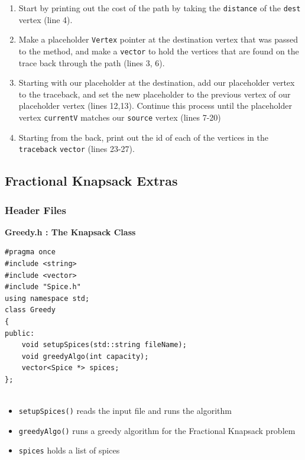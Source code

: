 \documentclass[letterpaper, 10pt]{article}
\begin{document}
\begin{enumerate}
    \item Start by printing out the cost of the path by taking the \texttt{distance} of the \texttt{dest} vertex (line 4).
    \item Make a placeholder \texttt{Vertex} pointer at the destination vertex that was passed to the method, and make a \texttt{vector} to hold the vertices that are found on the trace back through the path (lines 3, 6).
    \item Starting with our placeholder at the destination, add our placeholder vertex to the traceback, and set the new placeholder to the previous vertex of our placeholder vertex (lines 12,13). Continue this process until the placeholder vertex \texttt{currentV} matches our \texttt{source} vertex (lines 7-20)
    \item Starting from the back, print out the id of each of the vertices in the \texttt{traceback} \texttt{vector} (lines 23-27).
\end{enumerate}

\subsection{Fractional Knapsack Extras}
\subsubsection{Header Files}

\textbf{Greedy.h : The Knapsack Class}
 \begin{addmargin}[-5em]{1em}
\begin{small}
\begin{verbatim}
#pragma once
#include <string>
#include <vector>
#include "Spice.h"
using namespace std;
class Greedy
{
public:
    void setupSpices(std::string fileName);
    void greedyAlgo(int capacity);
    vector<Spice *> spices;
};


\end{verbatim}
\end{small}
\end{addmargin}   

\begin{itemize}
    \item \texttt{setupSpices()} reads the input file and runs the algorithm
    \item \texttt{greedyAlgo()} runs a greedy algorithm for the Fractional Knapsack problem
    \item \texttt{spices} holds a list of spices
\end{itemize}
\end{document}
